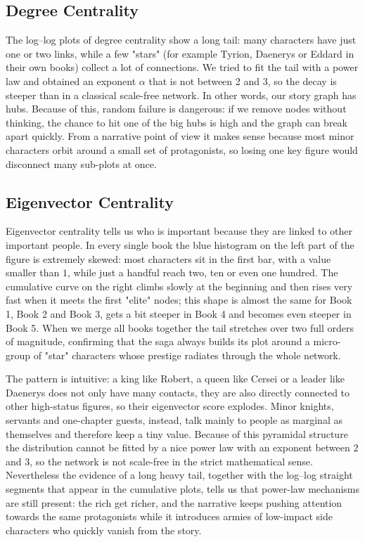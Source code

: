 \documentclass[12pt, a4paper]{article}
\begin{document}
\subsection*{Degree Centrality} 
The log–log plots of degree centrality show a long tail: many characters have just one or two links, while a few "stars" (for example Tyrion, Daenerys or Eddard in their own books) collect a lot of connections.
We tried to fit the tail with a power law and obtained an exponent $\alpha$ that is not between 2 and 3, so the decay is steeper than in a classical scale-free network. In other words, our story graph has hubs. Because of this, random failure is dangerous: if we remove nodes without thinking, the chance to hit one of the big hubs is high and the graph can break apart quickly. From a narrative point of view it makes sense because most minor characters orbit around a small set of protagonists, so losing one key figure would disconnect many sub-plots at once.
\subsection*{Eigenvector Centrality}
Eigenvector centrality tells us who is important because they are linked to other important people.
In every single book the blue histogram on the left part of the figure is extremely skewed: most characters sit in the first bar, with a value smaller than $1$, while just a handful reach two, ten or even one hundred.  The cumulative curve on the right climbs slowly at the beginning and then rises very fast when it meets the first "elite" nodes; this shape is almost the same for Book 1, Book 2 and Book 3, gets a bit steeper in Book 4 and becomes even steeper in Book 5.  When we merge all books together the tail stretches over two full orders of magnitude, confirming that the saga always builds its plot around a micro-group of "star" characters whose prestige radiates through the whole network.

The pattern is intuitive: a king like Robert, a queen like Cersei or a leader like Daenerys does not only have many contacts, they are also directly connected to other high-status figures, so their eigenvector score explodes.  Minor knights, servants and one-chapter guests, instead, talk mainly to people as marginal as themselves and therefore keep a tiny value.  Because of this pyramidal structure the distribution cannot be fitted by a nice power law with an exponent between $2$ and $3$, so the network is not scale-free in the strict mathematical sense.  Nevertheless the evidence of a long heavy tail, together with the log–log straight segments that appear in the cumulative plots, tells us that power-law mechanisms are still present: the rich get richer, and the narrative keeps pushing attention towards the same protagonists while it introduces armies of low-impact side characters who quickly vanish from the story.
\end{document}
